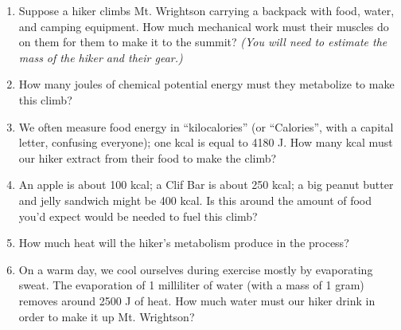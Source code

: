 \documentclass[12pt]{article}
\begin{document}
\begin{enumerate}
	\item Suppose a hiker climbs Mt. Wrightson carrying a backpack with food, water, and camping equipment. How much mechanical work must their muscles do on them for them to make it to the summit? {\it (You will need to estimate the mass of the hiker and their gear.)}
	\newpage 
	\item How many joules of chemical potential energy must they metabolize to make this climb?
	\vspace{1in}
	\item We often measure food energy in ``kilocalories'' (or ``Calories'', with a capital letter, confusing everyone); one kcal is equal to 4180 J. How many kcal must our hiker extract from their food to make the climb?
	\vspace{1in}
	\item An apple is about 100 kcal; a Clif Bar is about 250 kcal; a big peanut butter and jelly sandwich might be 400 kcal. Is this around the amount of food you'd expect would be needed to fuel this climb?
		\vspace{1in}
		
	\item How much heat will the hiker's metabolism produce in the process?
	\vspace{1in}
	
	\item On a warm day, we cool ourselves during exercise mostly by evaporating sweat. The evaporation of 1 milliliter of water (with a mass of 1 gram) removes around 2500 J of heat. How much water must our hiker drink in order to make it up Mt. Wrightson?
	
\end{enumerate}


 
\end{document}
